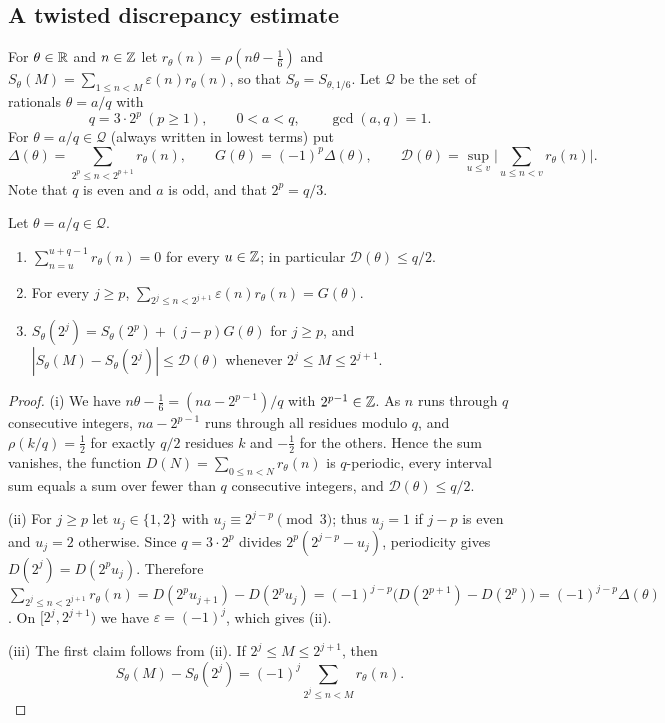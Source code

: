 \subsection{A twisted discrepancy estimate}\label{IA:ssec:TD}
For $\theta\in\mathbb{R}$ and $n\in\mathbb{Z}$ let $r_\theta(n)=\rho(n\theta-\frac16)$ and
$S_\theta(M)=\sum_{1\le n<M}\varepsilon(n)r_\theta(n)$, so that $S_\theta=S_{\theta,1/6}$. Let
$\mathcal Q$ be the set of rationals $\theta=a/q$ with
\[
q=3\cdot2^p\ (p\ge1),\qquad 0<a<q,\qquad\gcd(a,q)=1 .
\]
For $\theta=a/q\in\mathcal Q$ (always written in lowest terms) put
\[
\Delta(\theta)=\sum_{2^p\le n<2^{p+1}}r_\theta(n),\qquad G(\theta)=(-1)^p\Delta(\theta),\qquad
\mathcal D(\theta)=\sup_{u\le v}\Big|\sum_{u\le n<v}r_\theta(n)\Big| .
\]
Note that $q$ is even and $a$ is odd, and that $2^p=q/3$.

\begin{lemma}\label{IA:lem:TD0}
Let $\theta=a/q\in\mathcal Q$.
\begin{enumerate}[label=\textup{(\roman*)}]
\item $\sum_{n=u}^{u+q-1}r_\theta(n)=0$ for every $u\in\mathbb{Z}$; in particular $\mathcal D(\theta)\le q/2$.
\item For every $j\ge p$, $\sum_{2^j\le n<2^{j+1}}\varepsilon(n)r_\theta(n)=G(\theta)$.
\item $S_\theta(2^j)=S_\theta(2^p)+(j-p)G(\theta)$ for $j\ge p$, and
$|S_\theta(M)-S_\theta(2^j)|\le\mathcal D(\theta)$ whenever $2^j\le M\le 2^{j+1}$.
\end{enumerate}
\end{lemma}

\begin{proof}
(i) We have $n\theta-\frac16=(na-2^{p-1})/q$ with $2^{p-1}\in\mathbb{Z}$. As $n$ runs through $q$
consecutive integers, $na-2^{p-1}$ runs through all residues modulo $q$, and $\rho(k/q)=\frac12$ for
exactly $q/2$ residues $k$ and $-\frac12$ for the others. Hence the sum vanishes, the function
$D(N)=\sum_{0\le n<N}r_\theta(n)$ is $q$-periodic, every interval sum equals a sum over fewer than $q$
consecutive integers, and $\mathcal D(\theta)\le q/2$.

(ii) For $j\ge p$ let $u_j\in\{1,2\}$ with $u_j\equiv2^{j-p}\pmod 3$; thus $u_j=1$ if $j-p$ is even
and $u_j=2$ otherwise. Since $q=3\cdot2^p$ divides $2^p(2^{j-p}-u_j)$, periodicity gives
$D(2^j)=D(2^pu_j)$. Therefore
$\sum_{2^j\le n<2^{j+1}}r_\theta(n)=D(2^pu_{j+1})-D(2^pu_j)=(-1)^{j-p}\big(D(2^{p+1})-D(2^p)\big)
=(-1)^{j-p}\Delta(\theta)$. On $[2^j,2^{j+1})$ we have $\varepsilon=(-1)^j$, which gives (ii).

(iii) The first claim follows from (ii). If $2^j\le M\le2^{j+1}$, then
\[
S_\theta(M)-S_\theta(2^j)=(-1)^j\sum_{2^j\le n<M}r_\theta(n).
\]
\end{proof}

